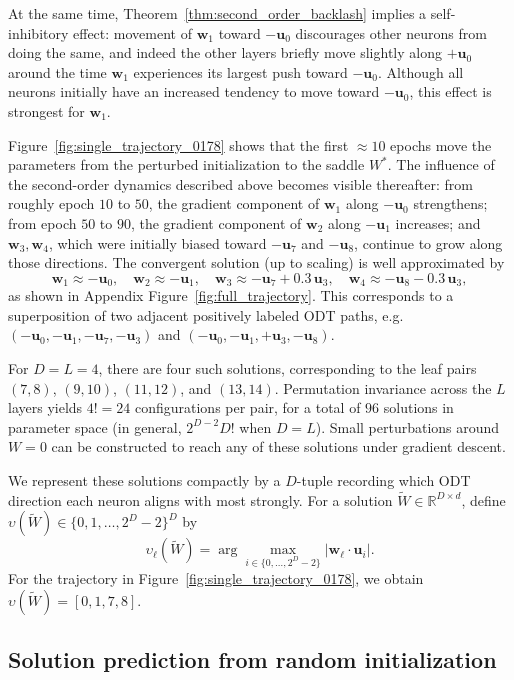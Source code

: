 \documentclass{article}
\theoremstyle{plain}
\theoremstyle{definition}
\theoremstyle{remark}
\newcommand{\R}{{\mathbb R}}
\newcommand{\1}{{\mathbf 1}}
\newcommand{\0}{{\mathbf 0}}
\newcommand{\w}{{\mathbf w}}
\newcommand{\bu}{{\mathbf u}}
\renewcommand{\>}{{\rightarrow}}
\begin{document}
At the same time, Theorem~\ref{thm:second_order_backlash} implies a self-inhibitory effect: movement of $\w_1$ toward $-\bu_0$ discourages other neurons from doing the same, and indeed the other layers briefly move slightly along $+\bu_0$ around the time $\w_1$ experiences its largest push toward $-\bu_0$. Although all neurons initially have an increased tendency to move toward $-\bu_0$, this effect is strongest for $\w_1$.

Figure~\ref{fig:single_trajectory_0178} shows that the first $\approx 10$ epochs move the parameters from the perturbed initialization to the saddle $W^*$. The influence of the second-order dynamics described above becomes visible thereafter: from roughly epoch $10$ to $50$, the gradient component of $\w_1$ along $-\bu_0$ strengthens; from epoch $50$ to $90$, the gradient component of $\w_2$ along $-\bu_1$ increases; and $\w_3,\w_4$, which were initially biased toward $-\bu_7$ and $-\bu_8$, continue to grow along those directions. The convergent solution (up to scaling) is well approximated by
\[
\w_1 \approx -\bu_0,\quad
\w_2 \approx -\bu_1,\quad
\w_3 \approx -\bu_7 + 0.3\,\bu_3,\quad
\w_4 \approx -\bu_8 - 0.3\,\bu_3,
\]
as shown in Appendix Figure~\ref{fig:full_trajectory}. This corresponds to a superposition of two adjacent positively labeled ODT paths, e.g. $(-\bu_0,-\bu_1,-\bu_7,-\bu_3)$ and $(-\bu_0,-\bu_1,+\bu_3,-\bu_8)$.

For $D=L=4$, there are four such solutions, corresponding to the leaf pairs $(7,8)$, $(9,10)$, $(11,12)$, and $(13,14)$. Permutation invariance across the $L$ layers yields $4!=24$ configurations per pair, for a total of $96$ solutions in parameter space (in general, $2^{D-2} D!$ when $D=L$). Small perturbations around $W=0$ can be constructed to reach any of these solutions under gradient descent.

We represent these solutions compactly by a $D$-tuple recording which ODT direction each neuron aligns with most strongly. For a solution $\tilde W \in \R^{D\times d}$, define $\upsilon(\tilde W) \in \{0,1,\ldots,2^D-2\}^D$ by
\[
\upsilon_\ell(\tilde W) = \arg\max_{i \in \{0,\ldots,2^D-2\}} |\w_\ell \cdot \bu_i|.
\]
For the trajectory in Figure~\ref{fig:single_trajectory_0178}, we obtain $\upsilon(\tilde W) = [0,1,7,8]$.

\subsection{Solution prediction from random initialization}
\label{sec:trajectory_prediction}
\end{document}
